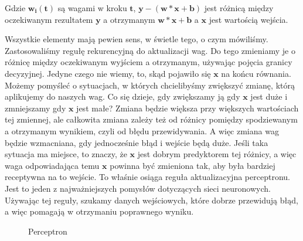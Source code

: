 \noindent Gdzie $\boldsymbol{w_i(t)}$ są wagami w kroku $\boldsymbol{t}$, $\boldsymbol{y - (w * x + b)}$ jest różnicą między oczekiwanym rezultatem $\boldsymbol{y}$ a otrzymanym $\boldsymbol{w * x + b}$ a $\boldsymbol{x}$ jest wartością wejścia.\newline

Wszystkie elementy mają pewien sens, w świetle tego, o czym mówiliśmy. Zastosowaliśmy regułę rekurencyjną do aktualizacji wag. Do tego zmieniamy je o różnicę między oczekiwanym wyjściem a otrzymanym, używając pojęcia granicy decyzyjnej. Jedyne czego nie wiemy, to, skąd pojawiło się $\boldsymbol{x}$ na końcu równania. Możemy pomyśleć o sytuacjach, w których chcielibyśmy zwiększyć zmianę, którą aplikujemy do naszych wag. Co się dzieje, gdy zwiększamy ją gdy $\boldsymbol{x}$ jest duże i zmniejszamy gdy $\boldsymbol{x}$ jest małe? Zmiana będzie większa przy większych wartościach tej zmiennej, ale całkowita zmiana zależy też od różnicy pomiędzy spodziewanym a otrzymanym wynikiem, czyli od błędu przewidywania. A więc zmiana wag będzie wzmacniana, gdy jednocześnie błąd i wejście będą duże. Jeśli taka sytuacja ma miejsce, to znaczy, że $\boldsymbol{x}$ jest dobrym predyktorem tej różnicy, a więc waga odpowiadająca temu $\boldsymbol{x}$ powinna być zmieniona tak, aby była bardziej receptywna na to wejście. To właśnie osiąga reguła aktualizacyjna perceptronu. Jest to jeden z najważniejszych pomysłów dotyczących sieci neuronowych. Używając tej reguły, szukamy danych wejściowych, które dobrze przewidują błąd, a więc pomagają w otrzymaniu poprawnego wyniku.\newline

\clearpage
\begin{figure}[H]
\centering

\caption{Perceptron}
\end{figure}
\clearpage

